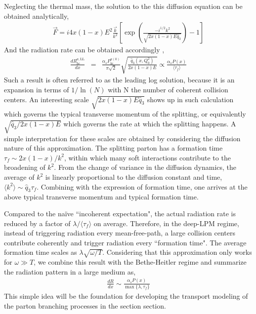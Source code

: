 Neglecting the thermal mass, the solution to the this diffusion equation can be obtained analytically,
\begin{eqnarray}
\vec{F} = i 4x(1-x)E^2 \frac{\vec{k}}{k^2} \left[\exp\left(\frac{-i^{1/2}k^2}{\sqrt{2x(1-x)E\hat{q}_3}}\right)-1\right]
\end{eqnarray}
And the radiation rate can be obtained accordingly \cite{Arnold:2008zu},
\begin{eqnarray}\label{eq:AMY-LL}
\frac{dR_{bc}^{a,\textrm{LL}}}{dx} &=& \frac{\alpha_s P_{bc}^{a(0)}}{\pi\sqrt{2}}
\sqrt{\frac{\hat{q}_3(x, Q_0^2)}{2x(1-x)E}} \propto \frac{\alpha_s P(x)}{\langle \tau_f \rangle}
\end{eqnarray}
Such a result is often referred to as the leading log solution, because it is an expansion in terms of $1/\ln(N)$ with N the number of coherent collision centers.
An interesting scale $\sqrt{2x(1-x)E\hat{q}_3}$ shows up in such calculation which governs the typical transverse momentum of the splitting, or equivalently $\sqrt{\hat{q}_3/2x(1-x)E}$ which governs the rate at which the splitting happens.
A simple interpretation for these scales are obtained by considering the diffusion nature of this approximation.
The splitting parton has a formation time $\tau_f \sim 2x(1-x)/k^2$, within which many soft interactions contribute to the broadening of $k^2$.
From the change of variance in the diffusion dynamics, the average of $k^2$ is linearly proportional to the diffusion constant and time, $\langle k^2\rangle \sim \hat{q}_3\tau_f$.
Combining with the expression of formation time, one arrives at the above typical transverse momentum and typical formation time.

Compared to the na\"ive ``incoherent expectation", the actual radiation rate is reduced by a factor of $\lambda/\langle \tau_f \rangle$ on average. 
Therefore, in the deep-LPM regime, instead of triggering radiation every mean-free-path, a large collision centers contribute coherently and trigger radiation every ``formation time".
The average formation time scales as $\lambda \sqrt{\omega/T}$.
Considering that this approximation only works for $\omega \gg T$, we combine this result with the Bethe-Heitler regime and summarize the radiation pattern in a large medium as,
\begin{eqnarray}
\frac{dR}{dx} \sim \frac{\alpha_s P(x)}{\max\{\lambda, \tau_f\}}
\end{eqnarray}
This simple idea will be the foundation for developing the transport modeling of the parton branching processes in the section section.

